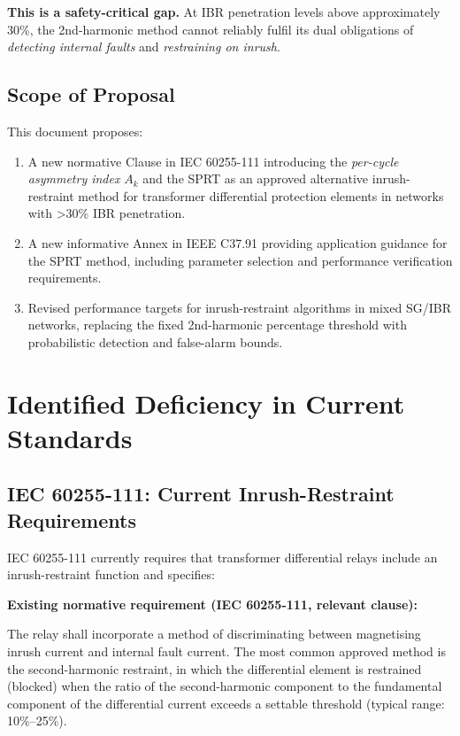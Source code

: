 \documentclass[11pt, a4paper]{article}
\begin{document}
\noindent
\textbf{This is a safety-critical gap.}  At IBR penetration levels above
approximately 30\%, the 2nd-harmonic method cannot reliably fulfil its
dual obligations of \emph{detecting internal faults} and \emph{restraining
on inrush}.

\subsection{Scope of Proposal}

This document proposes:
\begin{enumerate}
  \item A new normative Clause in IEC 60255-111 introducing the
    \emph{per-cycle asymmetry index} $A_k$ and the SPRT as an approved
    alternative inrush-restraint method for transformer differential
    protection elements in networks with \textgreater 30\% IBR penetration.
  \item A new informative Annex in IEEE C37.91 providing application guidance
    for the SPRT method, including parameter selection and performance
    verification requirements.
  \item Revised performance targets for inrush-restraint algorithms in
    mixed SG/IBR networks, replacing the fixed 2nd-harmonic percentage
    threshold with probabilistic detection and false-alarm bounds.
\end{enumerate}

\section{Identified Deficiency in Current Standards}

\subsection{IEC 60255-111: Current Inrush-Restraint Requirements}

IEC 60255-111 currently requires that transformer differential relays include
an inrush-restraint function and specifies:

\begin{normbox}
  \textbf{Existing normative requirement (IEC 60255-111, relevant clause):}

  \smallskip
  The relay shall incorporate a method of discriminating between
  magnetising inrush current and internal fault current.  The most common
  approved method is the second-harmonic restraint, in which the
  differential element is restrained (blocked) when the ratio of the
  second-harmonic component to the fundamental component of the differential
  current exceeds a settable threshold (typical range: 10\%–25\%).
\end{normbox}
\end{document}
